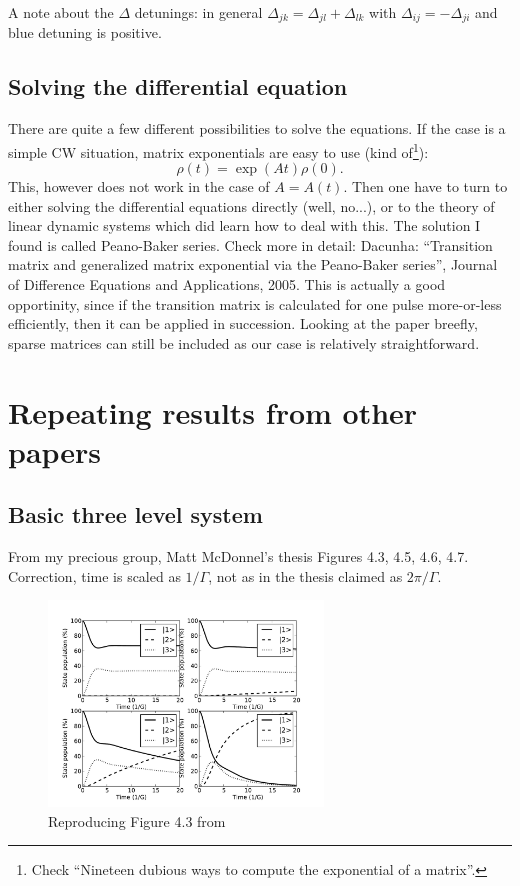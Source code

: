 \documentclass{article}
\begin{document}
\begin{spacing}{1.1}
A note about the $\Delta$ detunings: in general $\Delta_{jk} = \Delta_{jl} + \Delta_{lk}$ with $\Delta_{ij} = - \Delta_{ji}$ and blue detuning is positive.

\subsection{Solving the differential equation}

There are quite a few different possibilities to solve the equations. If the case is a simple CW situation, matrix exponentials are easy to use (kind of\footnote{Check ``Nineteen dubious ways to compute the exponential of a matrix''.}):
\begin{equation}
\rho(t) = \exp(At)\rho(0).
\end{equation}
This, however does not work in the case of $A = A(t)$. Then one have to turn to either solving the differential equations directly (well, no...), or to the theory of linear dynamic systems which did learn how to deal with this. The solution I found is called Peano-Baker series. Check more in detail: Dacunha: ``Transition matrix and generalized matrix exponential via the Peano-Baker series'', Journal of Difference Equations and Applications, 2005. This is actually a good opportinity, since if the transition matrix is calculated for one pulse more-or-less efficiently, then it can be applied in succession. Looking at the paper breefly, sparse matrices can still be included as our case is relatively straightforward.

\section{Repeating results from other papers}

\subsection{Basic three level system}
From my precious group, Matt McDonnel's thesis \cite{McDonnell2003}
Figures 4.3, 4.5, 4.6, 4.7. Correction, time is scaled as $1/\Gamma$, not as in the thesis claimed as $2\pi/\Gamma$.

\begin{figure}
\begin{center}
\includegraphics[width=0.65\textwidth]{figures/matt43.pdf}
\caption{Reproducing Figure 4.3 from \cite{McDonnell2003}}
\label{fig:matt43}
\end{center}
\end{figure}


\end{spacing}
\end{document}
